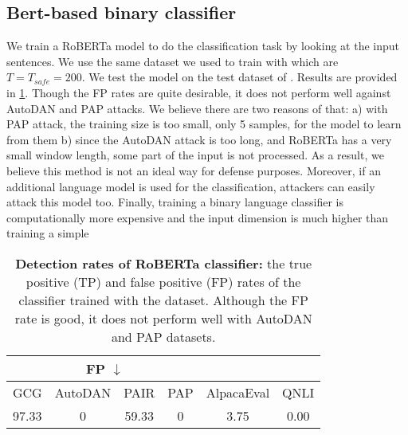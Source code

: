 \subsection{Bert-based binary classifier}
\label{app:bert}

We train a RoBERTa model to do the classification task by looking at the input sentences. We use the same dataset we used to train \methodname{} with \vicuna{} which are $T=T_{safe}=200$. We test the model on the test dataset of \vicuna{}. Results are provided in \cref{table:bert}. Though the FP rates are quite desirable, it does not perform well against AutoDAN and PAP attacks. We believe there are two reasons of that: a) with PAP attack, the training size is too small, only 5 samples, for the model to learn from them b) since the AutoDAN attack is too long, and RoBERTa has a very small window length, some part of the input is not processed. As a result, we believe this method is not an ideal way for defense purposes. Moreover, if an additional language model is used for the classification, attackers can easily attack this model too. Finally, training a binary language classifier is computationally more expensive and the input dimension is much higher than training a simple

\begin{table}[!h]
\caption{\textbf{Detection rates of RoBERTa classifier:} the true positive (TP) and false positive (FP) rates of the classifier trained with the \vicuna{} dataset. Although the FP rate is good, it does not perform well with AutoDAN and PAP datasets. }
\label{table:bert}
\begin{center}
\begin{small}
\begin{tabular}{ c c c c | c c }
\toprule
\rowcolor{black!10}  \multicolumn{4}{c}{\textbf{TP $\uparrow$}} & \multicolumn{2}{c}{\textbf{FP $\downarrow$}} \\
\midrule
GCG&AutoDAN&PAIR&PAP&AlpacaEval&QNLI \\
97.33&0&59.33&0&3.75&0.00\\

\bottomrule
\end{tabular}
\end{small}
\end{center}
\vskip -0.1in
\end{table}


\subsection{}
\label{app:roc}

